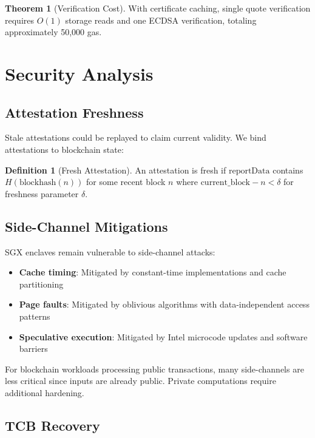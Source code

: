 \documentclass[11pt,a4paper]{article}
\theoremstyle{definition}
\newtheorem{definition}{Definition}
\newtheorem{theorem}{Theorem}
\begin{document}
\begin{theorem}[Verification Cost]
With certificate caching, single quote verification requires $O(1)$ storage reads and one ECDSA verification, totaling approximately 50,000 gas.
\end{theorem}

\section{Security Analysis}

\subsection{Attestation Freshness}

Stale attestations could be replayed to claim current validity. We bind attestations to blockchain state:

\begin{definition}[Fresh Attestation]
An attestation is fresh if $\text{reportData}$ contains $H(\text{blockhash}(n))$ for some recent block $n$ where $\text{current\_block} - n < \delta$ for freshness parameter $\delta$.
\end{definition}

\subsection{Side-Channel Mitigations}

SGX enclaves remain vulnerable to side-channel attacks:

\begin{itemize}
    \item \textbf{Cache timing}: Mitigated by constant-time implementations and cache partitioning
    \item \textbf{Page faults}: Mitigated by oblivious algorithms with data-independent access patterns
    \item \textbf{Speculative execution}: Mitigated by Intel microcode updates and software barriers
\end{itemize}

For blockchain workloads processing public transactions, many side-channels are less critical since inputs are already public. Private computations require additional hardening.

\subsection{TCB Recovery}
\end{document}
